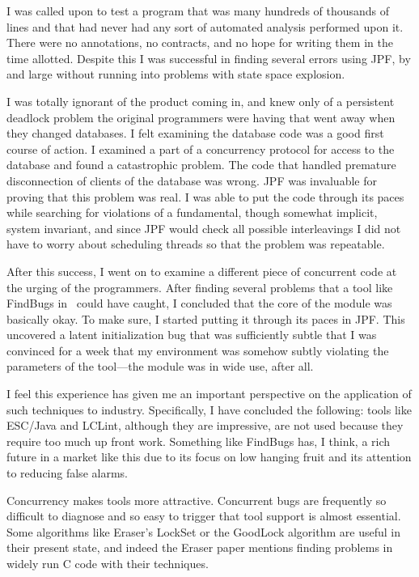 \documentclass{article}
\begin{document}
\begin{multicols}{2}
I was called upon to test a program that was many hundreds of
thousands of lines and that had never had any sort of automated
analysis performed upon it.  There were no annotations, no contracts,
and no hope for writing them in the time allotted.  Despite this I was
successful in finding several errors using JPF, by and large without
running into problems with state space explosion.

I was totally ignorant of the product coming in, and knew only of a
persistent deadlock problem the original programmers were having that
went away when they changed databases.  I felt examining the database
code was a good first course of action.  I examined a part of a
concurrency protocol for access to the database and found a
catastrophic problem.  The code that handled premature disconnection
of clients of the database was wrong.  JPF was invaluable for proving
that this problem was real.  I was able to put the code through its
paces while searching for violations of a fundamental, though somewhat
implicit, system invariant, and since JPF would check all possible
interleavings I did not have to worry about scheduling threads so that
the problem was repeatable.

After this success, I went on to examine a different piece of
concurrent code at the urging of the programmers.  After finding
several problems that a tool like FindBugs
in~\cite{hovemeyer04finding} could have caught, I concluded that the
core of the module was basically okay.  To make sure, I started
putting it through its paces in JPF.  This uncovered a latent
initialization bug that was sufficiently subtle that I was convinced
for a week that my environment was somehow subtly violating the
parameters of the tool---the module was in wide use, after all.

I feel this experience has given me an important perspective on the
application of such techniques to industry.  Specifically, I have
concluded the following: tools like ESC/Java and LCLint, although they
are impressive, are not used because they require too much up front
work.  Something like FindBugs has, I think, a rich future in a market
like this due to its focus on low hanging fruit and its attention to
reducing false alarms.

Concurrency makes tools more attractive.  Concurrent bugs are
frequently so difficult to diagnose and so easy to trigger that tool
support is almost essential.  Some algorithms like Eraser's LockSet or
the GoodLock algorithm are useful in their present state, and indeed
the Eraser paper mentions finding problems in widely run C code with
their techniques.


\end{multicols}
\end{document}
